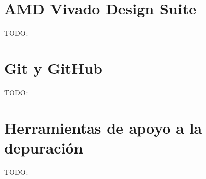 \section{AMD Vivado Design Suite}

TODO:

\section{Git y GitHub}

TODO:

\section{Herramientas de apoyo a la depuración}

TODO: